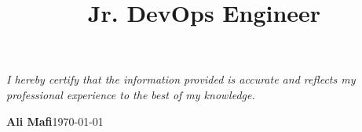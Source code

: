 \documentclass[11pt, a4paper, sans, final]{moderncv}
\title{Jr. DevOps Engineer}
\begin{document}
\maketitle


%


%

\emptysection{}\closesection{}
\vfill
\begin{center}
    \textit{I hereby certify that the information provided is accurate and reflects my professional experience to the best of my knowledge.}
    \vspace{1em}

    \textbf{Ali Mafi}\hspace{4cm}\today
\end{center}
\end{document}
